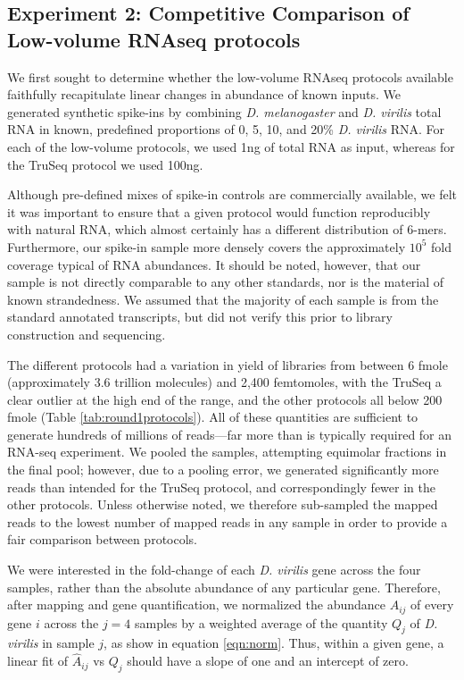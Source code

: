 \subsection{Experiment 2: Competitive Comparison of Low-volume RNAseq protocols}

We first sought to determine whether the low-volume RNAseq protocols available faithfully recapitulate linear changes in abundance of known inputs. We generated synthetic spike-ins by combining {\em D. melanogaster} and {\em D. virilis} total RNA in known, predefined proportions of 0, 5, 10, and 20\% {\em D. virilis} RNA. For each of the low-volume protocols, we used 1ng of total RNA as input, whereas for the TruSeq protocol we used 100ng.

Although pre-defined mixes of spike-in controls are commercially available, we felt it was important to ensure that a given protocol would function reproducibly with natural RNA, which almost certainly has a different distribution of 6-mers. Furthermore, our spike-in sample more densely covers the approximately $10^5$ fold coverage typical of RNA abundances.  It should be noted, however, that our sample is not directly comparable to any other standards, nor is the material of known strandedness.  We assumed that the majority of each sample is from the standard annotated transcripts, but did not verify this prior to library construction and sequencing.

The different protocols had a variation in yield of libraries from between 6 fmole (approximately 3.6 trillion molecules) and 2,400 femtomoles, with the TruSeq a clear outlier at the high end of the range, and the other protocols all below 200 fmole (Table \ref{tab:round1protocols}).  All of these quantities are sufficient to generate hundreds of millions of reads---far more than is typically required for an RNA-seq experiment. We pooled the samples, attempting equimolar fractions in the final pool; however, due to a pooling error, we generated significantly more reads than intended for the TruSeq protocol, and correspondingly fewer in the other protocols. Unless otherwise noted, we therefore sub-sampled the mapped reads to the lowest number of mapped reads in any sample in order to provide a fair comparison between protocols. 

We were interested in the fold-change of each {\em D. virilis} gene across the four samples, rather than the absolute abundance of any particular gene. Therefore, after mapping and gene quantification, we normalized the abundance $A_{ij}$ of every gene $i$ across the $j=4$ samples by a weighted average of the quantity $Q_j$ of {\em D. virilis} in sample $j$, as show in equation \ref{eqn:norm}.  Thus, within a given gene, a linear fit of $\hat{A}_{ij}$ vs $Q_j$ should have a slope of one and an intercept of zero.

